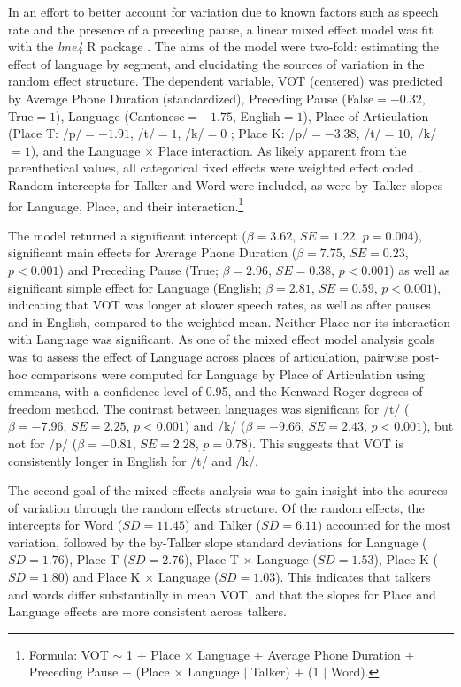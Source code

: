 In an effort to better account for variation due to known factors such as speech rate and the presence of a preceding pause, a linear mixed effect model was fit with the \textit{lme4} R package \citep{bates_2015_lme4}. The aims of the model were two-fold: estimating the effect of language by segment, and elucidating the sources of variation in the random effect structure. The dependent variable, VOT (centered) was predicted by Average Phone Duration (standardized), Preceding Pause (False$=-0.32$, True$=1$), Language (Cantonese$=-1.75$, English$=1$), Place of Articulation (Place T: /p/$=-1.91$, /t/$=1$, /k/$=0$ ; Place K: /p/$=-3.38$, /t/$=10$, /k/$=1$), and the Language $\times$ Place interaction. As likely apparent from the parenthetical values, all categorical fixed effects were weighted effect coded \citep[following][]{chodroff_2017_structure}. Random intercepts for Talker and Word were included, as were by-Talker slopes for Language, Place, and their interaction.\footnote{Formula: VOT $\sim$ 1 $+$ Place $\times$ Language $+$ Average Phone Duration $+$ Preceding Pause $+$ (Place $\times$ Language $|$ Talker) $+$ (1 $|$ Word).}


The model returned a significant intercept ($\beta=3.62$, $SE=1.22$, $p=0.004$), significant main effects for Average Phone Duration ($\beta=7.75$, $SE=0.23$, $p<0.001$) and Preceding Pause (True; $\beta=2.96$, $SE=0.38$, $p<0.001$) as well as significant simple effect for Language (English; $\beta=2.81$, $SE=0.59$, $p<0.001$), indicating that VOT was longer at slower speech rates, as well as after pauses and in English, compared to the weighted mean. Neither Place nor its interaction with Language was significant. As one of the mixed effect model analysis goals was to assess the effect of Language across places of articulation, pairwise post-hoc comparisons were computed for Language by Place of Articulation using emmeans, with a confidence level of 0.95, and the Kenward-Roger degrees-of-freedom method. The contrast between languages was significant for /t/ ($\beta=-7.96$, $SE=2.25$, $p<0.001$) and /k/ ($\beta=-9.66$, $SE=2.43$, $p<0.001$), but not for /p/ ($\beta=-0.81$, $SE=2.28$, $p=0.78$). This suggests that VOT is consistently longer in English for /t/ and /k/.

The second goal of the mixed effects analysis was to gain insight into the sources of variation through the random effects structure. Of the random effects, the intercepts for Word ($SD=11.45$) and Talker ($SD=6.11$) accounted for the most variation, followed by the by-Talker slope standard deviations for Language ($SD=1.76$), Place T ($SD=2.76$), Place T $\times$ Language ($SD=1.53$), Place K ($SD=1.80$) and Place K $\times$ Language ($SD=1.03$). This indicates that talkers and words differ substantially in mean VOT, and that the slopes for Place and Language effects are more consistent across talkers.

